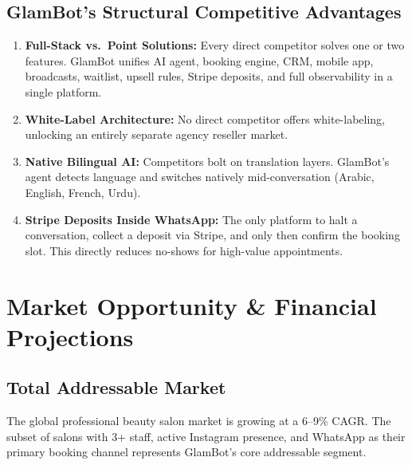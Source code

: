 \documentclass[11pt,a4paper]{report}
\begin{document}
\section{GlamBot's Structural Competitive Advantages}
\begin{enumerate}
    \item \textbf{Full-Stack vs.\ Point Solutions:} Every direct competitor solves one or two features. GlamBot unifies AI agent, booking engine, CRM, mobile app, broadcasts, waitlist, upsell rules, Stripe deposits, and full observability in a single platform.
    \item \textbf{White-Label Architecture:} No direct competitor offers white-labeling, unlocking an entirely separate agency reseller market.
    \item \textbf{Native Bilingual AI:} Competitors bolt on translation layers. GlamBot's agent detects language and switches natively mid-conversation (Arabic, English, French, Urdu).
    \item \textbf{Stripe Deposits Inside WhatsApp:} The only platform to halt a conversation, collect a deposit via Stripe, and only then confirm the booking slot. This directly reduces no-shows for high-value appointments.
\end{enumerate}

\chapter{Market Opportunity \& Financial Projections}

\section{Total Addressable Market}
The global professional beauty salon market is growing at a 6--9\% CAGR. The subset of salons with 3+ staff, active Instagram presence, and WhatsApp as their primary booking channel represents GlamBot's core addressable segment.
\end{document}
